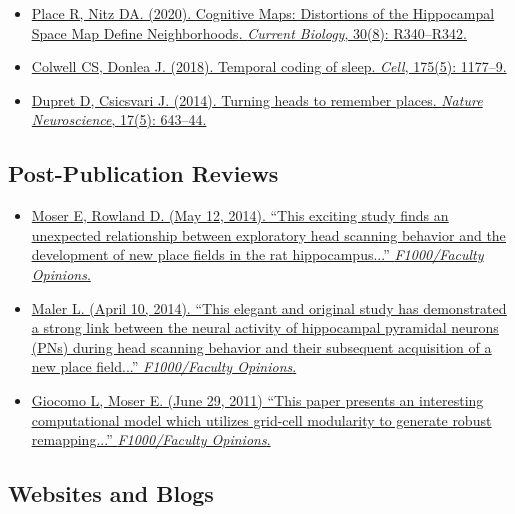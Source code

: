 \documentclass[10pt]{article}
\newcommand{\itemtitle}[1]{{\color{hopkinsblue}\ul{#1}}}
\begin{document}
\begin{itemize}
  \item \href{https://dx.doi.org/10.1016/j.cub.2020.02.085}
    {Place R, Nitz DA. (2020). \itemtitle{Cognitive Maps: Distortions of the Hippocampal 
      Space Map Define Neighborhoods}. \emph{Current Biology}, 30(8): R340--R342.}
  \item \href{https://dx.doi.org/10.1016/j.cell.2018.10.047}
    {Colwell CS, Donlea J. (2018). \itemtitle{Temporal coding of sleep}. \emph{Cell}, 175(5): 1177--9.}
  \item \href{https://dx.doi.org/10.1038/nn.3700}
    {Dupret D, Csicsvari J. (2014). \itemtitle{Turning heads to remember
    places}. \emph{Nature Neuroscience}, 17(5): 643--44.}
\end{itemize}

\subsection*{Post-Publication Reviews}

\begin{itemize}
  \item \href{https://facultyopinions.com/prime/718333676#eval793494783}
    {Moser E, Rowland D. (May 12, 2014). ``\itemtitle{This exciting study finds
        an unexpected relationship between exploratory head scanning behavior
      and the development of new place fields in the rat hippocampus...}”
    \emph{F1000/Faculty Opinions}.}
  \item \href{https://facultyopinions.com/prime/718333676#eval793493493}
    {Maler L. (April 10, 2014). ``\itemtitle{This elegant and original study has
        demonstrated a strong link between the neural activity of hippocampal pyramidal
        neurons (PNs) during head scanning behavior and their subsequent acquisition of
    a new place field...}'' \emph{F1000/Faculty Opinions}.}
  \item \href{https://facultyopinions.com/prime/11553956}
    {Giocomo L, Moser E. (June 29, 2011) ``\itemtitle{This paper presents an
        interesting computational model which utilizes grid-cell modularity to generate
    robust remapping...}'' \emph{F1000/Faculty Opinions}.}
\end{itemize}

\subsection*{Websites and Blogs}
\end{document}
